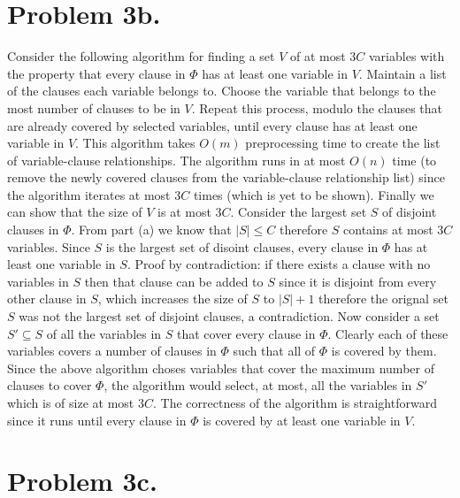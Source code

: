 \documentclass[12pt]{article}
\begin{document}
\section*{Problem 3b.}
Consider the following algorithm for finding a set $V$ of at most $3C$ variables
with the property that every clause in $\Phi$ has at least one variable in $V$.
Maintain a list of the clauses each variable belongs to. Choose the variable that
belongs to the most number of clauses to be in $V$. Repeat this process, modulo
the clauses that are already covered by selected variables, until every clause
has at least one variable in $V$. This algorithm takes $O(m)$ preprocessing time
to create the list of variable-clause relationships. The algorithm runs in at
most $O(n)$ time (to remove the newly covered clauses from the variable-clause
relationship list) since the algorithm iterates at most $3C$ times (which is yet
to be shown). Finally we can show that the size of $V$ is at most $3C$. Consider
the largest set $S$ of disjoint clauses in $\Phi$. From part (a) we know that
$|S| \le C$ therefore $S$ contains at most $3C$ variables. Since $S$ is the
largest set of disoint clauses, every clause in $\Phi$ has at least one variable
in $S$. Proof by contradiction: if there exists a clause with no variables in
$S$ then that clause can be added to $S$ since it is disjoint from every other
clause in $S$, which increases the size of $S$ to $|S|+1$ therefore the orignal
set $S$ was not the largest set of disjoint clauses, a contradiction. Now
consider a set $S' \subseteq S$ of all the variables in $S$ that cover every
clause in $\Phi$. Clearly each of these variables covers a number of clauses in
$\Phi$ such that all of $\Phi$ is covered by them. Since the above algorithm
choses variables that cover the maximum number of clauses to cover $\Phi$, the
algorithm would select, at most, all the variables in $S'$ which is of size at
most $3C$. The correctness of the algorithm is straightforward since it runs
until every clause in $\Phi$ is covered by at least one variable in $V$.

\section*{Problem 3c.}
\end{document}
